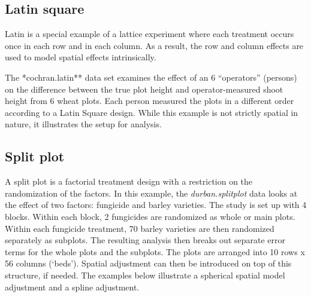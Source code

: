 \documentclass[
]{book}
\newenvironment{Shaded}{\begin{snugshade}}{\end{snugshade}}
\newcommand{\NormalTok}[1]{#1}
\begin{document}
\hypertarget{latin-square-1}{%
\subsection{Latin square}\label{latin-square-1}}

Latin is a special example of a lattice experiment where each treatment occurs once in each row and in each column. As a result, the row and column effects are used to model spatial effects intrinsically.

The *cochran.latin** data set examines the effect of an 6 ``operators'' (persons) on the difference between the true plot height and operator-measured shoot height from 6 wheat plots. Each person measured the plots in a different order according to a Latin Square design. While this example is not strictly spatial in nature, it illustrates the setup for analysis.

\begin{Shaded}
\end{Shaded}

\hypertarget{split-plot-1}{%
\subsection{Split plot}\label{split-plot-1}}

A split plot is a factorial treatment design with a restriction on the randomization of the factors. In this example, the \emph{durban.splitplot} data looks at the effect of two factors: fungicide and barley varieties. The study is set up with 4 blocks. Within each block, 2 fungicides are randomized as whole or main plots. Within each fungicide treatment, 70 barley varieties are then randomized separately as subplots. The resulting analysis then breaks out separate error terms for the whole plots and the subplots. The plots are arranged into 10 rows x 56 columns (`beds'). Spatial adjustment can then be introduced on top of this structure, if needed. The examples below illustrate a spherical spatial model adjustment and a spline adjustment.
\end{document}

